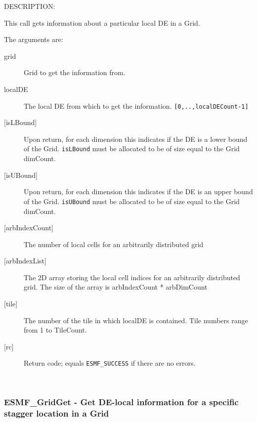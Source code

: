 {\sf DESCRIPTION:\\ }


   This call gets information about a particular local DE in a Grid.
  
  The arguments are:
  \begin{description}
  \item[grid]
      Grid to get the information from.
  \item[localDE]
       The local DE from which to get the information. {\tt [0,..,localDECount-1]}
  \item[{[isLBound]}]
       Upon return, for each dimension this indicates if the DE is a lower bound of the Grid.
       {\tt isLBound} must be allocated to be of size equal to the Grid dimCount.
  \item[{[isUBound]}]
       Upon return, for each dimension this indicates if the DE is an upper bound of the Grid.
       {\tt isUBound} must be allocated to be of size equal to the Grid dimCount.
   \item[{[arbIndexCount]}]
     The number of local cells for an arbitrarily distributed grid
   \item[{[arbIndexList]}]
     The 2D array storing the local cell indices for an arbitrarily distributed grid. The size of the array
     is arbIndexCount * arbDimCount
  \item[{[tile]}]
       The number of the tile in which localDE is contained. Tile numbers range from 1 to TileCount.
  \item[{[rc]}]
       Return code; equals {\tt ESMF\_SUCCESS} if there are no errors.
  \end{description}
   
 
\mbox{}\hrulefill\ 
 

  \label{API:GridGetPLocalDePSloc}\subsubsection [ESMF\_GridGet] {ESMF\_GridGet - Get DE-local information for a specific stagger location in a Grid}


